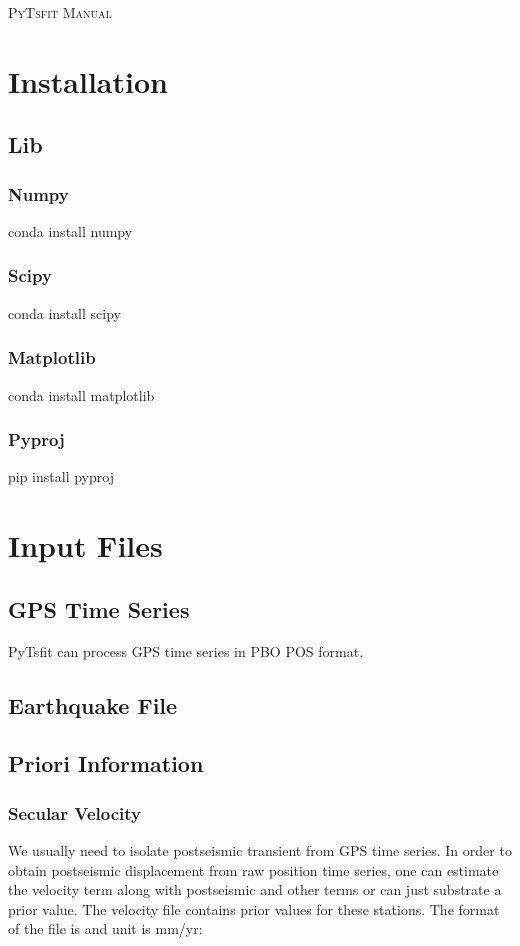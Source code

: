 \documentclass[UTF8,a4paper]{report}
\begin{document}
\pagestyle{empty}
\begin{center}
\Large\scshape PyTsfit Manual
\end{center}



\chapter{Installation}
\section{Lib}
\subsection{Numpy}
conda install numpy

\subsection{Scipy}
conda install scipy

\subsection{Matplotlib}
conda install matplotlib

\subsection{Pyproj}
pip install pyproj

\chapter{Input Files}
\section{GPS Time Series}
PyTsfit can process GPS time series in PBO POS format.

\section{Earthquake File}

\section{Priori Information}
\subsection{Secular Velocity}
We usually need to isolate postseismic transient from GPS time series. In order to obtain postseismic displacement from raw position time series, one can estimate the velocity term along with postseismic and other terms or can just substrate a prior value. The velocity file contains prior values for these stations. The format of the file is and unit is mm/yr:
\begin{center}
\end{center}
\end{document}
